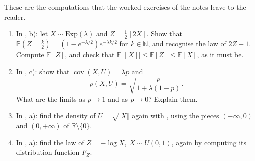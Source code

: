 
\begin{exercise}\label{ex:rv-worked-details}
\easy These are the computations that the worked exercises of the notes leave to the reader.
\begin{enumerate}[label=(\alph*)]
  \item In , b): let $X\sim\mathrm{Exp}(\lambda)$ and $Z=\frac12[2X]$.
    Show that $\mathbb P(Z=\frac k2)=(1-e^{-\lambda/2})e^{-\lambda k/2}$ for $k\in\mathbb N$, and
    recognise the law of $2Z+1$. Compute $\mathbb E[Z]$, and check that
    $\mathbb E\big[[X]\big]\le\mathbb E[Z]\le\mathbb E[X]$, as it must be.
  \item In , c): show that $\operatorname{cov}(X,U)=\lambda p$ and
    \[
      \rho(X,U)=\sqrt{\frac p{1+\lambda(1-p)}} .
    \]
    What are the limits as $p\to1$ and as $p\to0$? Explain them.
  \item In , a): find the density of $U=\sqrt{|X|}$ again with
    , using the pieces $(-\infty,0)$ and $(0,+\infty)$ of
    $\mathbb R\setminus\{0\}$.
  \item In , a): find the law of $Z=-\log X$, $X\sim U(0,1)$,
    again by computing its distribution function $F_Z$.
\end{enumerate}
\end{exercise}

